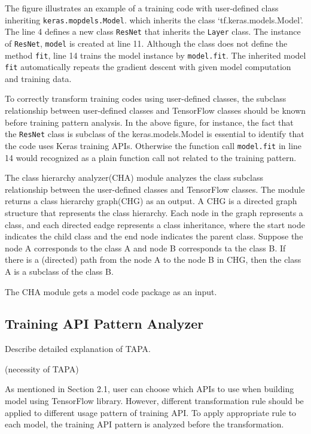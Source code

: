 

The figure illustrates an example of a training code with
user-defined class inheriting {\tt keras.mopdels.Model}.
which inherits the class `tf.keras.models.Model'.
The line 4 defines a new class {\tt ResNet} that inherits the  
{\tt Layer} class. The instance of {\tt ResNet}, {\tt model}
is created at line 11. Although the class does not define
the method {\tt fit}, line 14 trains the model instance by
{\tt model.fit}. The inherited model {\tt fit}
automatically repeats the gradient descent with
given model computation and training data. 

To correctly transform training codes using user-defined classes,
the subclass relationship between user-defined classes
and TensorFlow classes should be known before training pattern analysis. 
In the above figure, for instance, the fact that the {\tt ResNet} class
is subclass of the {keras.models.Model} is essential to identify
that the code uses Keras training APIs. 
Otherwise the function call {\tt model.fit} in line 14 would
recognized as a plain function call not related to the training pattern.

The class hierarchy analyzer(CHA) module analyzes the
class subclass relationship between the 
user-defined classes and TensorFlow classes.
The module returns a class hierarchy graph(CHG) as an output.
A CHG is a directed graph structure that represents the class hierarchy.
Each node in the graph represents a class,
and each directed eadge represents a class inheritance,
where the start node indicates the child class
and the end node indicates the parent class.
Suppose the node A corresponds to the class A and node B corresponds ta
the class B.
If there is a (directed) path from the node A to the node B in CHG,
then the class A is a subclass of the class B.

The CHA module gets a model code package as an input.


\subsection{Training API Pattern Analyzer}
Describe detailed explanation of TAPA.

(necessity of TAPA)

As mentioned in Section 2.1, user can choose which APIs to use
when building model using TensorFlow library.
However, different transformation rule should be applied
to different usage pattern of training API.
To apply appropriate rule to each model,
the training API pattern is analyzed before the transformation.

